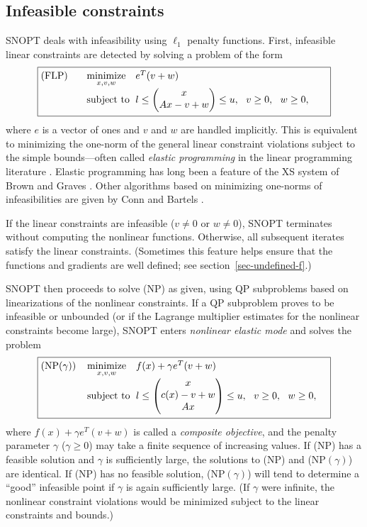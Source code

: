 \documentclass[draft,leqno,onefignum,onetabnum]{siamltex}
\makeatletter
\def\minim{\mathop{\hbox{\rm minimize}}}
\def\minimize#1{{\displaystyle\minim_{#1}}}
\def\subject{\mbox{\rm subject to}}
\def\strutl{\rule[-1.25ex]{0pt}{3ex}}%
\def\NP#1{NP$(#1)$}
\def\NPSOL {{\small NPSOL}}
\def\SNOPT {{\small SNOPT}}
\def\problem#1#2#3#4{\fbox
   {\begin{tabular*}{0.84\textwidth}
    {@{}l@{\extracolsep{\fill}}l@{\extracolsep{6pt}}l@{\extracolsep{\fill}}c@{}}
      #1 & $\minimize{#2}$ & $#3$ & $ $ \\[5pt]
         & $\subject$      & $#4$ & $ $
    \end{tabular*}}}
\newcommand{\pmat}[1]{\begin{pmatrix}#1\end{pmatrix}}
\makeatother
\begin{document}
\subsection{Infeasible constraints} \label{sec-infeas}

\SNOPT{} deals with infeasibility using $\ell_1$ penalty functions.
First, infeasible linear constraints are detected by solving a problem
of the form
%
\[
   \problem{(FLP)}{x,v,w}{e^T(v + w)}{%
                   l \le \pmat{x\\ Ax - v + w \strutl} \le u, \ \ %
                   v \ge 0,\ \ w \ge 0,}
\]
where $e$ is a vector of ones and $v$ and $w$ are handled implicitly.
This is equivalent to minimizing the one-norm of the general linear
constraint violations subject to the simple bounds---often called
\emph{elastic programming} in the linear programming literature
\cite{BroG75b}.  Elastic programming has long been a feature of the
XS system of Brown and Graves \cite{BroG75a}.  Other algorithms based
on minimizing one-norms of infeasibilities are given by Conn
\cite{Con76} and Bartels \cite{Bar80}.

  If the linear constraints are infeasible ($v \ne 0$ or $w \ne 0$),
\SNOPT{} terminates without computing the nonlinear functions.
Otherwise, all subsequent iterates satisfy the linear constraints.
(Sometimes this feature helps ensure that the functions and gradients are well
defined; see section~\ref{sec-undefined-f}.)

\SNOPT{} then proceeds to solve (NP) as given, using QP subproblems
based on linearizations of the nonlinear constraints.
If a QP subproblem proves to be infeasible or unbounded (or if the
Lagrange multiplier estimates for the nonlinear constraints become
large), \SNOPT{} enters \emph{nonlinear elastic mode} and solves the problem
\[
   \problem{(\NP{\gamma})}{x,v,w}{f(x) + \gamma e^T(v + w)}
                 { l \le \pmat{x\\ c(x) - v + w \\Ax \strutl} \le u,
                   \ \ v \ge 0,\ \ w \ge 0,}
\]
where $f(x) + \gamma e^T(v + w)$ is called a \emph{composite objective},
and the penalty parameter $\gamma$ ($\gamma \ge 0$) may take a
finite sequence of increasing values.
If (NP) has a feasible solution and $\gamma$ is sufficiently large,
the solutions to (NP) and (\NP{\gamma}) are identical.
If (NP) has no feasible solution, (\NP{\gamma}) will tend to
determine a ``good'' infeasible point if $\gamma$ is again sufficiently
large.  (If $\gamma$ were infinite, the nonlinear constraint violations would
be minimized subject to the linear constraints and bounds.)
\end{document}
